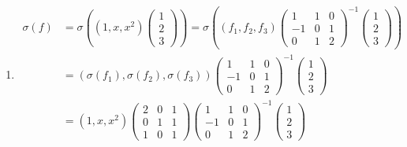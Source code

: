 \documentclass[12pt,fontset=fandol]{ctexart}
\begin{document}
\begin{solve}
\begin{enumerate}
                \item \begin{align*}
                          \sigma(f) & = \sigma\left((1, x, x^2)
                          \begin{pmatrix} 1 \\ 2 \\ 3 \end{pmatrix}\right)= \sigma\left((f_1, f_2, f_3)
                          \begin{pmatrix}
                              1  & 1 & 0 \\
                              -1 & 0 & 1 \\
                              0  & 1 & 2
                          \end{pmatrix}^{-1} \begin{pmatrix} 1 \\ 2 \\ 3 \end{pmatrix}\right) \\
                                    & = (\sigma(f_1), \sigma(f_2), \sigma(f_3))
                          \begin{pmatrix}
                              1  & 1 & 0 \\
                              -1 & 0 & 1 \\
                              0  & 1 & 2
                          \end{pmatrix}^{-1} \begin{pmatrix} 1 \\ 2 \\ 3 \end{pmatrix}        \\
                                    & = (1, x, x^2)
                          \begin{pmatrix}
                              2 & 0 & 1 \\
                              0 & 1 & 1 \\
                              1 & 0 & 1
                          \end{pmatrix}
                          \begin{pmatrix}
                              1  & 1 & 0 \\
                              -1 & 0 & 1 \\
                              0  & 1 & 2
                          \end{pmatrix}^{-1}
                          \begin{pmatrix} 1 \\ 2 \\ 3 \end{pmatrix}                           \\

\end{align*}
\end{enumerate}
\end{solve}
\end{document}
